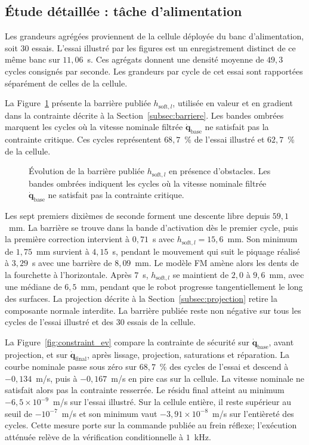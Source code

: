 \subsection{Étude détaillée : tâche d'alimentation}\label{subsec:res_feeding_deep}
Les grandeurs agrégées proviennent de la cellule déployée du banc d'alimentation, soit $30$ essais. L'essai illustré par les figures est un enregistrement distinct de ce même banc sur $11{,}06$~s. Ces agrégats donnent une densité moyenne de $49{,}3$ cycles consignés par seconde. Les grandeurs par cycle de cet essai sont rapportées séparément de celles de la cellule.

La Figure~\ref{fig:h_ev} présente la barrière publiée $h_{\mathrm{soft},l}$, utilisée en valeur et en gradient dans la contrainte décrite à la Section~\ref{subsec:barriere}. Les bandes ombrées marquent les cycles où la vitesse nominale filtrée $\dot{\mathbf{q}}_{\mathrm{base}}$ ne satisfait pas la contrainte critique. Ces cycles représentent $68{,}7$~\% de l'essai illustré et $62{,}7$~\% de la cellule.

\begin{figure}[!htbp]
    \centering
    
    \caption[Évolution temporelle de la barrière publiée]{Évolution de la barrière publiée $h_{\mathrm{soft},l}$ en présence d'obstacles. Les bandes ombrées indiquent les cycles où la vitesse nominale filtrée $\dot{\mathbf{q}}_{\mathrm{base}}$ ne satisfait pas la contrainte critique.}\label{fig:h_ev}
\end{figure}

Les sept premiers dixièmes de seconde forment une descente libre depuis $59{,}1$~mm. La barrière se trouve dans la bande d'activation dès le premier cycle, puis la première correction intervient à $0{,}71$~s avec $h_{\mathrm{soft},l}=15{,}6$~mm. Son minimum de $1{,}75$~mm survient à $4{,}15$~s, pendant le mouvement qui suit le piquage réalisé à $3{,}29$~s avec une barrière de $8{,}09$~mm. Le modèle \ac{FM} amène alors les dents de la fourchette à l'horizontale. Après $7$~s, $h_{\mathrm{soft},l}$ se maintient de $2{,}0$ à $9{,}6$~mm, avec une médiane de $6{,}5$~mm, pendant que le robot progresse tangentiellement le long des surfaces. La projection décrite à la Section~\ref{subsec:projection} retire la composante normale interdite. La barrière publiée reste non négative sur tous les cycles de l'essai illustré et des $30$ essais de la cellule.

La Figure~\ref{fig:constraint_ev} compare la contrainte de sécurité sur $\dot{\mathbf{q}}_{\mathrm{base}}$, avant projection, et sur $\dot{\mathbf{q}}_{\mathrm{final}}$, après lissage, projection, saturations et réparation. La courbe nominale passe sous zéro sur $68{,}7$~\% des cycles de l'essai et descend à $-0{,}134$~m/s, puis à $-0{,}167$~m/s en pire cas sur la cellule. La vitesse nominale ne satisfait alors pas la contrainte resserrée. Le résidu final atteint au minimum $-6{,}5\times10^{-9}$~m/s sur l'essai illustré. Sur la cellule entière, il reste supérieur au seuil de $-10^{-7}$~m/s et son minimum vaut $-3{,}91\times10^{-8}$~m/s sur l'entièreté des cycles. Cette mesure porte sur la commande publiée au frein réflexe; l'exécution atténuée relève de la vérification conditionnelle à $1$~kHz.

